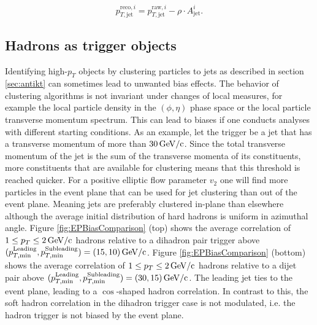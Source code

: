 \documentclass[
  a4paper,
  12pt,
  oneside,
  parskip=half,
  listof=totoc,
  bibliography=totoc,
  DIV=12,
  numbers=noenddot,
  BA.tex
  ]{subfiles}
\begin{document}
\begin{equation}
	p_{T,\text{jet}}^{\text{reco},i} = p_{T,\text{jet}}^{\text{raw},i} - \rho \cdot A_\text{jet}^i .
\end{equation}

\subsection{Hadrons as trigger objects}
\label{sec:hadron-triggers}

Identifying high-$p_T$ objects by clustering particles to jets as described in section \ref{sec:antikt} can sometimes lead to unwanted bias effects. The behavior of clustering algorithms is not invariant under changes of local measures, for example the local particle density in the $(\phi, \eta)$ phase space or the local particle transverse momentum spectrum. This can lead to biases if one conducts analyses with different starting conditions. As an example, let the trigger be a jet that has a transverse momentum of more than $30\bunit{GeV/c}$. Since the total transverse momentum of the jet is the sum of the transverse momenta of its constituents, more constituents that are available for clustering means that this threshold is reached quicker. For a positive elliptic flow parameter $v_2$ one will find more particles in the event plane that can be used for jet clustering than out of the event plane. Meaning jets are preferably clustered in-plane than elsewhere although the average initial distribution of hard hadrons is uniform in azimuthal angle. Figure \ref{fig:EPBiasComparison} (top) shows the average correlation of $1 \leq p_T \leq 2 \bunit{GeV/c}$ hadrons relative to a dihadron pair trigger above $(p_{T,\text{min}}^\text{Leading}, p_{T,\text{min}}^\text{Subleading}) = (15,10)\bunit{GeV/c}$. Figure \ref{fig:EPBiasComparison} (bottom) shows the average correlation of $1 \leq p_T \leq 2 \bunit{GeV/c}$ hadrons relative to a dijet pair above $(p_{T,\text{min}}^\text{Leading}, p_{T,\text{min}}^\text{Subleading}) = (30,15)\bunit{GeV/c}$. The leading jet ties to the event plane, leading to a $\cos$-shaped hadron correlation. In contrast to this, the soft hadron correlation in the dihadron trigger case is not modulated, i.e. the hadron trigger is not biased by the event plane.
\end{document}
